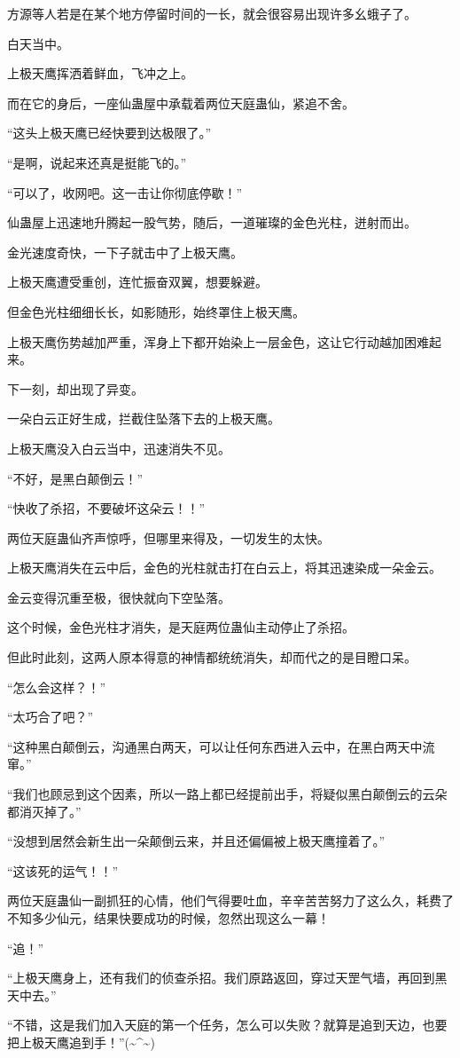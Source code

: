\begin{this_body}
方源等人若是在某个地方停留时间的一长，就会很容易出现许多幺蛾子了。

白天当中。

上极天鹰挥洒着鲜血，飞冲之上。

而在它的身后，一座仙蛊屋中承载着两位天庭蛊仙，紧追不舍。

“这头上极天鹰已经快要到达极限了。”

“是啊，说起来还真是挺能飞的。”

“可以了，收网吧。这一击让你彻底停歇！”

仙蛊屋上迅速地升腾起一股气势，随后，一道璀璨的金色光柱，迸射而出。

金光速度奇快，一下子就击中了上极天鹰。

上极天鹰遭受重创，连忙振奋双翼，想要躲避。

但金色光柱细细长长，如影随形，始终罩住上极天鹰。

上极天鹰伤势越加严重，浑身上下都开始染上一层金色，这让它行动越加困难起来。

下一刻，却出现了异变。

一朵白云正好生成，拦截住坠落下去的上极天鹰。

上极天鹰没入白云当中，迅速消失不见。

“不好，是黑白颠倒云！”

“快收了杀招，不要破坏这朵云！！”

两位天庭蛊仙齐声惊呼，但哪里来得及，一切发生的太快。

上极天鹰消失在云中后，金色的光柱就击打在白云上，将其迅速染成一朵金云。

金云变得沉重至极，很快就向下空坠落。

这个时候，金色光柱才消失，是天庭两位蛊仙主动停止了杀招。

但此时此刻，这两人原本得意的神情都统统消失，却而代之的是目瞪口呆。

“怎么会这样？！”

“太巧合了吧？”

“这种黑白颠倒云，沟通黑白两天，可以让任何东西进入云中，在黑白两天中流窜。”

“我们也顾忌到这个因素，所以一路上都已经提前出手，将疑似黑白颠倒云的云朵都消灭掉了。”

“没想到居然会新生出一朵颠倒云来，并且还偏偏被上极天鹰撞着了。”

“这该死的运气！！”

两位天庭蛊仙一副抓狂的心情，他们气得要吐血，辛辛苦苦努力了这么久，耗费了不知多少仙元，结果快要成功的时候，忽然出现这么一幕！

“追！”

“上极天鹰身上，还有我们的侦查杀招。我们原路返回，穿过天罡气墙，再回到黑天中去。”

“不错，这是我们加入天庭的第一个任务，怎么可以失败？就算是追到天边，也要把上极天鹰追到手！”(\~{}\^{}\~{})

\end{this_body}

